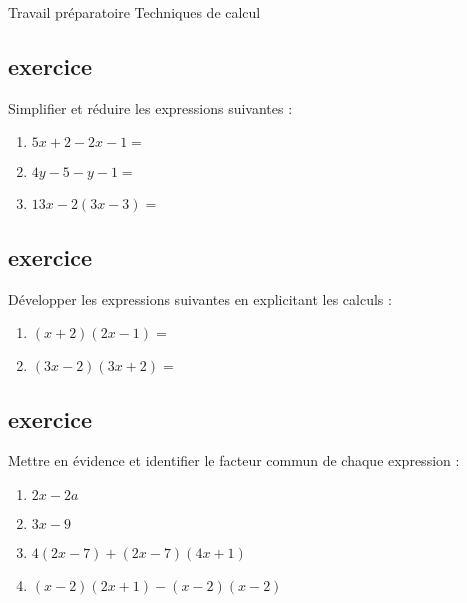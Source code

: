 \documentclass[10pt]{article}
\begin{document}
\begin{titre}{Travail préparatoire}
{\LARGE Techniques de calcul }   \\

 

 
\end{titre}


 


\bigskip

\subsection*{exercice}

Simplifier et réduire les expressions suivantes :
 
 \begin{enumerate}
  \item $5x + 2 -  2x - 1  = $  \vplus  
  \item $4y - 5  -y -1  = $  \vplus
  \item $13x - 2(3x - 3) = $  \vplus
 \end{enumerate}

\subsection*{exercice}

Développer les expressions suivantes en explicitant les calculs :
 
 \begin{enumerate}
  \item $(x + 2)(2x - 1) = $  \vplus  
  \item $(3x - 2)(3x + 2) = $  \vplus
 \end{enumerate}

\subsection*{exercice}

Mettre en évidence et identifier le facteur commun de chaque expression :

 \begin{enumerate}
 \item  $2x - 2a   $  \vplus
  \item  $3x - 9   $  \vplus
  \item  $4(2x - 7) + (2x - 7)(4x + 1)   $  \vplus
  \item  $(x - 2)(2x + 1) - (x - 2)(x - 2)   $  \vplus
 \end{enumerate}
 
 
\end{document}
